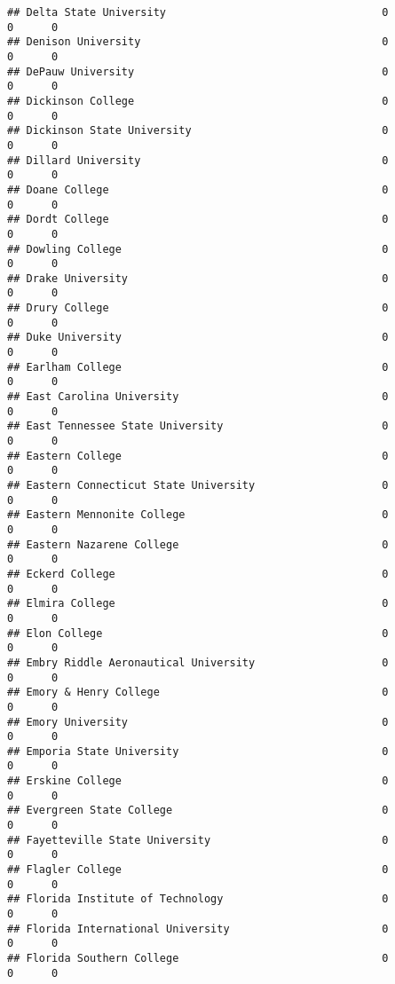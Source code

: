 \documentclass[
]{article}
\begin{document}
\begin{verbatim}
## Delta State University                                  0          0      0
## Denison University                                      0          0      0
## DePauw University                                       0          0      0
## Dickinson College                                       0          0      0
## Dickinson State University                              0          0      0
## Dillard University                                      0          0      0
## Doane College                                           0          0      0
## Dordt College                                           0          0      0
## Dowling College                                         0          0      0
## Drake University                                        0          0      0
## Drury College                                           0          0      0
## Duke University                                         0          0      0
## Earlham College                                         0          0      0
## East Carolina University                                0          0      0
## East Tennessee State University                         0          0      0
## Eastern College                                         0          0      0
## Eastern Connecticut State University                    0          0      0
## Eastern Mennonite College                               0          0      0
## Eastern Nazarene College                                0          0      0
## Eckerd College                                          0          0      0
## Elmira College                                          0          0      0
## Elon College                                            0          0      0
## Embry Riddle Aeronautical University                    0          0      0
## Emory & Henry College                                   0          0      0
## Emory University                                        0          0      0
## Emporia State University                                0          0      0
## Erskine College                                         0          0      0
## Evergreen State College                                 0          0      0
## Fayetteville State University                           0          0      0
## Flagler College                                         0          0      0
## Florida Institute of Technology                         0          0      0
## Florida International University                        0          0      0
## Florida Southern College                                0          0      0

\end{verbatim}
\end{document}
